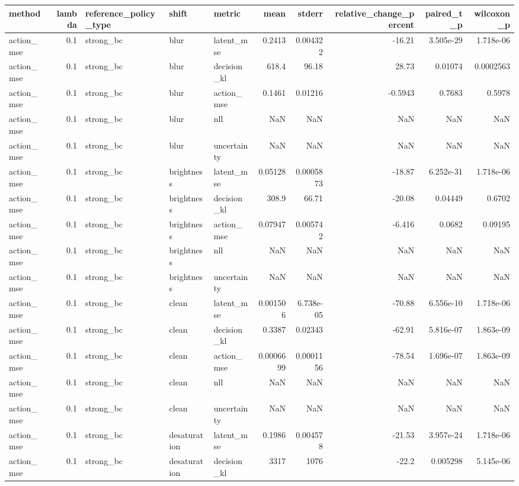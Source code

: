 \begin{tabular}{lrlllrrrrr}
\toprule
method & lambda & reference\_policy\_type & shift & metric & mean & stderr & relative\_change\_percent & paired\_t\_p & wilcoxon\_p \\
\midrule
action\_mse & 0.1 & strong\_bc & blur & latent\_mse & 0.2413 & 0.004322 & -16.21 & 3.505e-29 & 1.718e-06 \\
action\_mse & 0.1 & strong\_bc & blur & decision\_kl & 618.4 & 96.18 & 28.73 & 0.01074 & 0.0002563 \\
action\_mse & 0.1 & strong\_bc & blur & action\_mse & 0.1461 & 0.01216 & -0.5943 & 0.7683 & 0.5978 \\
action\_mse & 0.1 & strong\_bc & blur & nll & NaN & NaN & NaN & NaN & NaN \\
action\_mse & 0.1 & strong\_bc & blur & uncertainty & NaN & NaN & NaN & NaN & NaN \\
action\_mse & 0.1 & strong\_bc & brightness & latent\_mse & 0.05128 & 0.0005873 & -18.87 & 6.252e-31 & 1.718e-06 \\
action\_mse & 0.1 & strong\_bc & brightness & decision\_kl & 308.9 & 66.71 & -20.08 & 0.04449 & 0.6702 \\
action\_mse & 0.1 & strong\_bc & brightness & action\_mse & 0.07947 & 0.005742 & -6.416 & 0.0682 & 0.09195 \\
action\_mse & 0.1 & strong\_bc & brightness & nll & NaN & NaN & NaN & NaN & NaN \\
action\_mse & 0.1 & strong\_bc & brightness & uncertainty & NaN & NaN & NaN & NaN & NaN \\
action\_mse & 0.1 & strong\_bc & clean & latent\_mse & 0.001506 & 6.738e-05 & -70.88 & 6.556e-10 & 1.718e-06 \\
action\_mse & 0.1 & strong\_bc & clean & decision\_kl & 0.3387 & 0.02343 & -62.91 & 5.816e-07 & 1.863e-09 \\
action\_mse & 0.1 & strong\_bc & clean & action\_mse & 0.0006699 & 0.0001156 & -78.54 & 1.696e-07 & 1.863e-09 \\
action\_mse & 0.1 & strong\_bc & clean & nll & NaN & NaN & NaN & NaN & NaN \\
action\_mse & 0.1 & strong\_bc & clean & uncertainty & NaN & NaN & NaN & NaN & NaN \\
action\_mse & 0.1 & strong\_bc & desaturation & latent\_mse & 0.1986 & 0.004578 & -21.53 & 3.957e-24 & 1.718e-06 \\
action\_mse & 0.1 & strong\_bc & desaturation & decision\_kl & 3317 & 1076 & -22.2 & 0.005298 & 5.145e-06 \\

\end{tabular}
